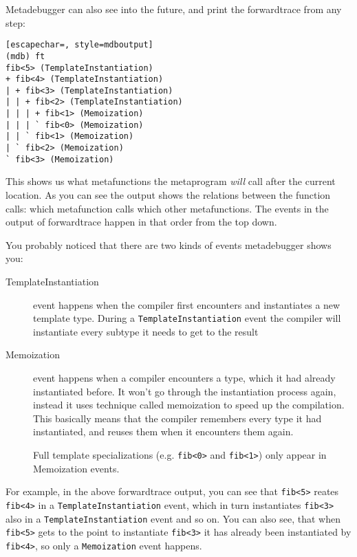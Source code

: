 Metadebugger can also see into the future, and print the forwardtrace from any
step:

\begin{minipage}{\linewidth}
\begin{lstlisting}[escapechar=, style=mdboutput]
(mdb) ft
fib<5> (TemplateInstantiation)
+ fib<4> (TemplateInstantiation)
| + fib<3> (TemplateInstantiation)
| | + fib<2> (TemplateInstantiation)
| | | + fib<1> (Memoization)
| | | ` fib<0> (Memoization)
| | ` fib<1> (Memoization)
| ` fib<2> (Memoization)
` fib<3> (Memoization)
\end{lstlisting}
\end{minipage}

This shows us what metafunctions the metaprogram \textit{will} call after the
current location. As you can see the output shows the relations between the
function calls: which metafunction calls which other metafunctions. The events
in the output of forwardtrace happen in that order from the top down.

You probably noticed that there are two kinds of events metadebugger shows you:

\begin{description}
    \item[TemplateInstantiation] event happens when the compiler first
        encounters and instantiates a new template type. During a
        \texttt{TemplateInstantiation} event the compiler will instantiate
        every subtype it needs to get to the result
    \item[Memoization] event happens when a compiler encounters a type, which
        it had already instantiated before. It won't go through the
        instantiation process again, instead it uses technique called
        memoization to speed up the compilation. This basically means that the
        compiler remembers every type it had instantiated, and reuses them when
        it encounters them again.

        Full template specializations (e.g. \texttt{fib<0>} and
        \texttt{fib<1>}) only appear in Memoization events.
\end{description}

For example, in the above forwardtrace output, you can see that \texttt{fib<5>}
reates \texttt{fib<4>} in a \texttt{TemplateInstantiation} event, which in turn
instantiates \texttt{fib<3>} also in a \texttt{TemplateInstantiation} event and
so on.  You can also see, that when \texttt{fib<5>} gets to the point to
instantiate \texttt{fib<3>} it has already been instantiated by
\texttt{fib<4>}, so only a \texttt{Memoization} event happens.

